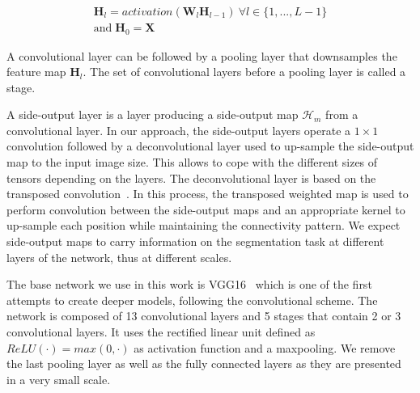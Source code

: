 \small
\begin{multline}
\mathbf{H}_l= activation(\mathbf{W}_l\mathbf{H}_{l-1})~\forall l \in \{1,...,L-1\} \\ \mbox{and} \; \mathbf{H}_0=\mathbf{X}
\end{multline}
\normalsize

A convolutional layer can be followed by a pooling layer that downsamples the feature map $\mathbf{H}_l$. The set of convolutional layers before a pooling layer is called a stage.


A side-output layer is a layer producing a side-output map $\mathcal{H}_m$ from a convolutional layer. In our approach, the side-output layers operate a $1 \times 1$ convolution followed by a deconvolutional layer used to up-sample the side-output map to the input image size. This allows to cope with the different sizes of tensors depending on the layers. The deconvolutional layer is based on the transposed convolution~\cite{dumoulin2016}. In this process, the transposed weighted map is used to perform convolution between the side-output maps and an appropriate kernel to up-sample each position while maintaining the connectivity pattern.
We expect side-output maps to carry information on the segmentation task at different layers of the network, thus at different scales.

The base network we use in this work is VGG16~\cite{simonyan2014} which is one of the first attempts to create deeper models, following the convolutional scheme. The network is composed of 13 convolutional layers and 5 stages that contain 2 or 3 convolutional layers. It uses the rectified linear unit defined as $ReLU(\cdot)=max(0,\cdot)$ as activation function and a maxpooling. We remove the last pooling layer as well as the fully connected layers as they are presented in a very small scale.


